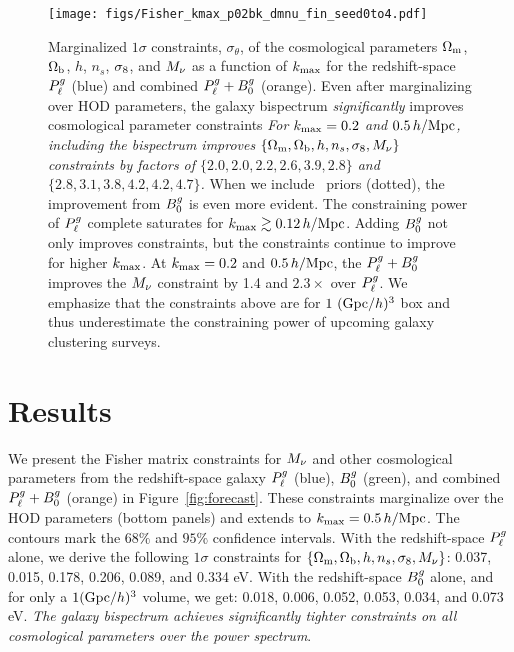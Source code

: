 \begin{figure}
    \begin{center}
        \texttt{[image: figs/Fisher\_kmax\_p02bk\_dmnu\_fin\_seed0to4.pdf]}
        \caption{Marginalized $1\sigma$ constraints, $\sigma_\theta$, of the
        cosmological parameters $\Omega_{\rm m}$, $\Omega_{\rm b}$, $h$, $n_s$, $\sigma_8$, and $M_\nu$
        as a function of $k_{\rm max}$ for the redshift-space $P^g_{\ell}$ (blue)
        and combined $P^g_{\ell} + B^g_0$ (orange). Even after marginalizing over
        HOD parameters, the galaxy bispectrum {\em significantly} improves 
        cosmological parameter constraints%
        {\em For $k_{\rm max} = 0.2$ and $0.5\,h/\mathrm{Mpc}$, including the bispectrum
        improves $\{\Omega_{\rm m}, \Omega_{\rm b}, h, n_s, \sigma_8, M_\nu\}$ constraints by factors 
        of $\{2.0, 2.0, 2.2, 2.6, 3.9, 2.8\}$ and $\{2.8, 3.1, 3.8, 4.2, 4.2, 4.7\}$.} 
        When we include \planck~priors (dotted), the improvement from $B^g_0$ is even more
        evident. The constraining power of $P^g_{\ell}$ complete
        saturates for $k_{\rm max} \gtrsim 0.12\,h/\mathrm{Mpc}$. Adding $B^g_0$ not only 
        improves constraints, but the constraints continue to improve for
        higher $k_{\rm max}$. At $k_{\rm max} = 0.2$ and $0.5\,h/\mathrm{Mpc}$, the $P^g_{\ell}
        + B^g_0$ improves the $M_\nu$ constraint by 1.4 and $2.3\times$ over $P^g_{\ell}$. 
        We emphasize that the constraints above are for $1~({\rm Gpc}/h)^3$ box
        and thus underestimate the constraining power of upcoming galaxy
        clustering surveys.
        }
        \label{fig:kmax_forecast}
    \end{center}
\end{figure}

\section{Results} \label{sec:results} 
We present the Fisher matrix constraints for $M_\nu$ and other cosmological
parameters from the redshift-space galaxy $P^g_{\ell}$ (blue), $B^g_0$ (green), and 
combined $P^g_{\ell} + B^g_0$ (orange) in Figure~\ref{fig:forecast}. These
constraints marginalize over the \cite{zheng2007} HOD parameters %
(bottom panels) and extends to $k_{\rm max} = 0.5\,h/\mathrm{Mpc}$. The contours mark the $68\%$ and
$95\%$ confidence intervals. With the redshift-space $P^g_{\ell}$
alone, we derive the following $1\sigma$ constraints for $\{\Omega_{\rm m}, \Omega_{\rm b}, h, n_s,
\sigma_8, M_\nu\}$: 
0.037, 0.015, 0.178, 0.206, 0.089, and 0.334 eV.
With the redshift-space $B^g_0$ alone, and for only a $1 ({\rm Gpc}/h)^3$ volume,
we get: 0.018, 0.006, 0.052, 0.053, 0.034, and 0.073 eV.
{\em The galaxy bispectrum achieves significantly tighter constraints on all
cosmological parameters over the power spectrum}. 

